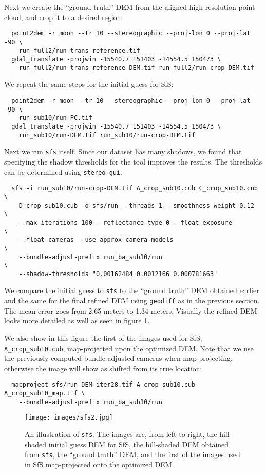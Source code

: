 Next we create the ``ground truth'' DEM from the aligned high-resolution
point cloud, and crop it to a desired region:
\begin{verbatim}
  point2dem -r moon --tr 10 --stereographic --proj-lon 0 --proj-lat -90 \
    run_full2/run-trans_reference.tif
  gdal_translate -projwin -15540.7 151403 -14554.5 150473 \
    run_full2/run-trans_reference-DEM.tif run_full2/run-crop-DEM.tif
\end{verbatim}
We repeat the same steps for the initial guess for SfS:
\begin{verbatim}
  point2dem -r moon --tr 10 --stereographic --proj-lon 0 --proj-lat -90 \
    run_sub10/run-PC.tif
  gdal_translate -projwin -15540.7 151403 -14554.5 150473 \
    run_sub10/run-DEM.tif run_sub10/run-crop-DEM.tif
\end{verbatim}
Next we run \texttt{sfs} itself. Since our dataset has many shadows, we found
that specifying the shadow thresholds for the tool improves the
results. The thresholds can be determined using \texttt{stereo\_gui}.
\begin{verbatim}
  sfs -i run_sub10/run-crop-DEM.tif A_crop_sub10.cub C_crop_sub10.cub \
    D_crop_sub10.cub -o sfs/run --threads 1 --smoothness-weight 0.12  \
    --max-iterations 100 --reflectance-type 0 --float-exposure        \
    --float-cameras --use-approx-camera-models                        \
    --bundle-adjust-prefix run_ba_sub10/run                           \
    --shadow-thresholds "0.00162484 0.0012166 0.000781663"
\end{verbatim}
We compare the initial guess to \texttt{sfs} to the ``ground truth'' DEM
obtained earlier and the same for the final refined DEM using
\texttt{geodiff} as in the previous section. The mean error goes from
2.65 meters to 1.34 meters. Visually the refined DEM looks more detailed
as well as seen in figure \ref{fig:sfs2}.

We also show in this figure the first of the images used for SfS,
\verb#A_crop_sub10.cub#, map-projected upon the optimized DEM. Note that
we use the previously computed bundle-adjusted cameras when
map-projecting, otherwise the image will show as shifted from its true
location:
\begin{verbatim}
  mapproject sfs/run-DEM-iter28.tif A_crop_sub10.cub A_crop_sub10_map.tif \
    --bundle-adjust-prefix run_ba_sub10/run
\end{verbatim}
\begin{figure}[h!]
\begin{center}
\texttt{[image: images/sfs2.jpg]}
\caption[sfs]{An illustration of \texttt{sfs}. The images are, from
  left to right, the hill-shaded initial guess DEM for SfS, the hill-shaded DEM obtained
from \texttt{sfs}, the ``ground truth'' DEM, and the first of the
images used in SfS map-projected onto the optimized DEM.}
\label{fig:sfs2}
\end{center}
\end{figure}

